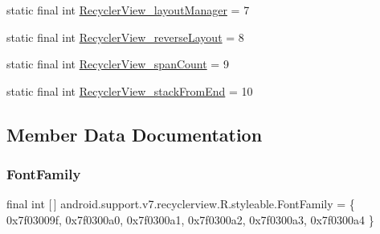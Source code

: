 \begin{DoxyCompactItemize}
\item 
static final int \mbox{\hyperlink{classandroid_1_1support_1_1v7_1_1recyclerview_1_1R_1_1styleable_ade58ca5f3c9266666ecba3450b58cb66}{Recycler\+View\+\_\+layout\+Manager}} = 7
\item 
static final int \mbox{\hyperlink{classandroid_1_1support_1_1v7_1_1recyclerview_1_1R_1_1styleable_a41b8dce4d149422b23cc47d6ed94d093}{Recycler\+View\+\_\+reverse\+Layout}} = 8
\item 
static final int \mbox{\hyperlink{classandroid_1_1support_1_1v7_1_1recyclerview_1_1R_1_1styleable_aa2ba7ea9d22cc1e759e2e397da74d906}{Recycler\+View\+\_\+span\+Count}} = 9
\item 
static final int \mbox{\hyperlink{classandroid_1_1support_1_1v7_1_1recyclerview_1_1R_1_1styleable_a027b5b2a3c1e9c19e9cb33da79eed6dc}{Recycler\+View\+\_\+stack\+From\+End}} = 10
\end{DoxyCompactItemize}


\subsection{Member Data Documentation}
\mbox{\label{classandroid_1_1support_1_1v7_1_1recyclerview_1_1R_1_1styleable_a8669b92c2940f7b32cfaa23107b532bb}} 
\subsubsection{\texorpdfstring{Font\+Family}{FontFamily}}
{\footnotesize\ttfamily final int \mbox{[}$\,$\mbox{]} android.\+support.\+v7.\+recyclerview.\+R.\+styleable.\+Font\+Family = \{ 0x7f03009f, 0x7f0300a0, 0x7f0300a1, 0x7f0300a2, 0x7f0300a3, 0x7f0300a4 \}\hspace{0.3cm}{\ttfamily [static]}}

\mbox{\label{classandroid_1_1support_1_1v7_1_1recyclerview_1_1R_1_1styleable_aa367d79f89aec314ed6c7191af0a408a}} 
